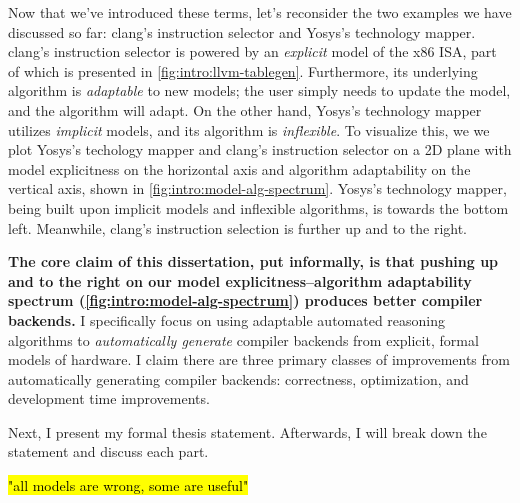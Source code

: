   



Now that we've introduced these terms,
  let's 
  reconsider the two examples we have discussed so far:
  clang's instruction selector
  and Yosys's technology mapper.
clang's instruction selector is powered by
  an \textit{explicit} model of the x86 ISA,
  part of which is presented in
  \cref{fig:intro:llvm-tablegen}.
Furthermore, its underlying algorithm
  is \textit{adaptable} to new models;
  the user simply needs to update
  the model, and the algorithm will adapt.
On the other hand,
  Yosys's technology mapper utilizes
  \textit{implicit} models,
  and its algorithm is \textit{inflexible}.
To visualize this, we
  we plot Yosys's techology mapper
  and clang's instruction selector
  on a 2D plane
  with model explicitness on the horizontal axis
  and algorithm adaptability on the vertical axis,
  shown in \cref{fig:intro:model-alg-spectrum}.
Yosys's technology mapper,
  being built upon implicit models
  and inflexible algorithms,
  is towards the bottom left.
Meanwhile, clang's instruction selection
  is further up and to the right.


\textbf{The core claim of this dissertation,
  put informally,
  is that pushing up
  and to the right
  on our model explicitness--algorithm adaptability
  spectrum (\cref{fig:intro:model-alg-spectrum})
  produces better compiler backends.}
I specifically focus on
  using adaptable automated reasoning algorithms
  to \textit{automatically generate}
  compiler backends
  from explicit, formal models of hardware.
I claim there are three primary classes
  of improvements
  from automatically generating 
  compiler backends:
  correctness,
  optimization,
  and development time improvements.
  
Next, I present my formal
  thesis statement.
Afterwards, I will break down the statement
  and discuss each part.

\hl{"all models are wrong, some are useful"}

\begin{mdframed}
\mythesis
\end{mdframed}

